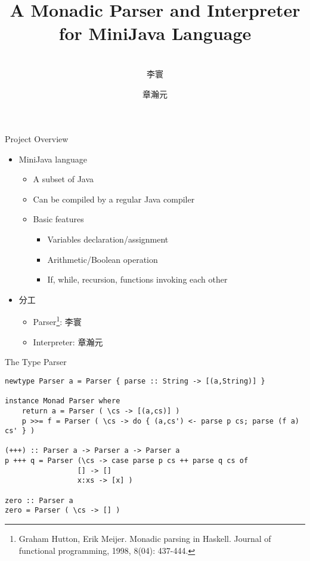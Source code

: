 \documentclass[12pt]{beamer}
\title{A Monadic Parser and Interpreter for MiniJava Language}
\author{\quad\\ 李寰\inst{1} \and 章瀚元\inst{2}}
\date{} %
\institute{
	\inst{1}
	16210240012@fudan.edu.cn
	\and
	\inst{2}
	16210240024@fudan.edu.cn
}
\newcommand{\codesize}{\fontsize{7.7}{7.7}}
\begin{document}
\begin{spacing}{1.3}

\begin{frame}
	\titlepage
\end{frame}

\begin{frame}{Project Overview}
\begin{itemize}
\item MiniJava language
	\begin{itemize}
		\item A subset of Java
		\item Can be compiled by a regular Java compiler
		\item Basic features
			\begin{itemize}
				\item Variables declaration/assignment
				\item Arithmetic/Boolean operation
				\item If, while, recursion, functions invoking each other
			\end{itemize}
	\end{itemize}
\item 分工
	\begin{itemize}
	\item Parser\footnote[frame]{Graham Hutton, Erik Meijer. Monadic parsing in Haskell. Journal of functional programming, 1998, 8(04): 437-444.\vspace{1pt}}: 李寰
	\item Interpreter: 章瀚元
	\end{itemize}
\end{itemize}
\end{frame}

\begin{frame}[fragile=singleslide]{The Type Parser}

\begin{verbatim}
newtype Parser a = Parser { parse :: String -> [(a,String)] }

instance Monad Parser where
    return a = Parser ( \cs -> [(a,cs)] )
    p >>= f = Parser ( \cs -> do { (a,cs') <- parse p cs; parse (f a) cs' } )

(+++) :: Parser a -> Parser a -> Parser a
p +++ q = Parser (\cs -> case parse p cs ++ parse q cs of
                 [] -> []
                 x:xs -> [x] )

zero :: Parser a
zero = Parser ( \cs -> [] )
\end{verbatim}
\end{frame}


\end{spacing}
\end{document}
